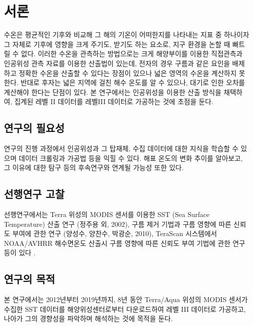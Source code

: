 \section{서론}
수온은 평균적인 기후와 비교해 그 해의 기온이 어떠한지를 나타내는 지표 중 하나이자 그 자체로 기후에 영향을 크게 주기도, 받기도 하는 요소로, 지구 환경을 논할 때 빠트릴 수 없다. 이러한 수온을 관측하는 방법으로는 크게 해양부이를 이용한 직접관측과 인공위성 관측 자료를 이용한 산출법이 있는데, 전자의 경우 구름과 같은 요인을 배제하고 정확한 수온을 산출할 수 있다는 장점이 있으나 넓은 영역의 수온을 계산하지 못한다. 반대로 후자는 넓은 지역에 걸친 해수 온도를 알 수 있으나, 대기로 인한 오차를 계산해야 한다는 단점이 있다. 본 연구에서는 인공위성을 이용한 산출 방식을 채택하여, 집계된 레벨 II 데이터를 레벨III 데이터로 가공하는 것에 초점을 둔다.


\subsection{연구의 필요성}
연구의 진행 과정에서 인공위성과 그 탑재체, 수집 데이터에 대한 지식을 학습할 수 있으며 데이터 크롤링과 가공법 등을 익힐 수 있다. 해표 온도의 변화 추이를 알아보고, 그 이유에 대한 탐구 등의 후속연구와 연계될 가능성 또한 있다. 

\subsection{선행연구 고찰}

선행연구에서는 Terra 위성의 MODIS 센서를 이용한 SST (Sea Surface Temperature) 산출 연구 (정주용 외, 2002), 구름 제거 기법과 구름 영향에 따른 신뢰도 부여에 관한 연구 (양성수, 양찬수, 박광순, 2010), TeraScan 시스템에서 NOAA/AVHRR 해수면온도 산출시 구름 영향에 따른 신뢰도 부여 기법에 관한 연구 등이 있다 \cite{Society2020} \cite{Surface2010} . 


\subsection{연구의 목적}
 본 연구에서는 2012년부터 2019년까지, 8년 동안 Terra/Aqua 위성의 MODIS 센서가 수집한 SST 데이터를 해양위성센터로부터 다운로드하여 레벨 III 데이터로 가공하고, 나아가 그의 경향성을 파악하며 해석하는 것에 목적을 둔다.